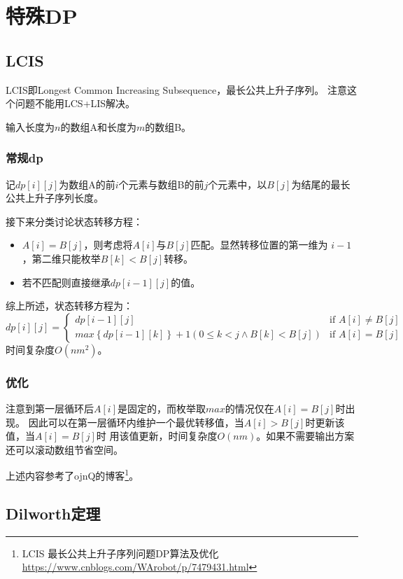 \section{特殊DP}
\subsection{LCIS}
LCIS即Longest Common Increasing Subsequence，最长公共上升子序列。
注意这个问题不能用LCS+LIS解决。

输入长度为$n$的数组A和长度为$m$的数组B。
\subsubsection{常规dp}
记$dp[i][j]$为数组A的前$i$个元素与数组B的前$j$个元素中，以$B[j]$为结尾的最长
公共上升子序列长度。

接下来分类讨论状态转移方程：
\begin{itemize}
    \item $A[i]=B[j]$，则考虑将$A[i]$与$B[j]$匹配。显然转移位置的第一维为
    $i-1$，第二维只能枚举$B[k]<B[j]$转移。
    \item 若不匹配则直接继承$dp[i-1][j]$的值。
\end{itemize}

综上所述，状态转移方程为：
\begin{displaymath}
    dp[i][j]=\left\{\begin{array}{lr}
        dp[i-1][j]&\textrm{if~}A[i]\neq B[j]\\
        max\left\{dp[i-1][k]\right\}+1 (0\leq k <j \wedge B[k]<B[j])&
        \textrm{if~}A[i]=B[j]
    \end{array}\right.
\end{displaymath}
时间复杂度$O(nm^2)$。
\subsubsection{优化}
注意到第一层循环后$A[i]$是固定的，而枚举取$max$的情况仅在$A[i]=B[j]$时出现。
因此可以在第一层循环内维护一个最优转移值，当$A[i]>B[j]$时更新该值，当$A[i]=B[j]$时
用该值更新，时间复杂度$O(nm)$。如果不需要输出方案还可以滚动数组节省空间。

上述内容参考了ojnQ的博客\footnote{
    LCIS 最长公共上升子序列问题DP算法及优化
    \url{https://www.cnblogs.com/WArobot/p/7479431.html}
}。
\subsection{Dilworth定理}

